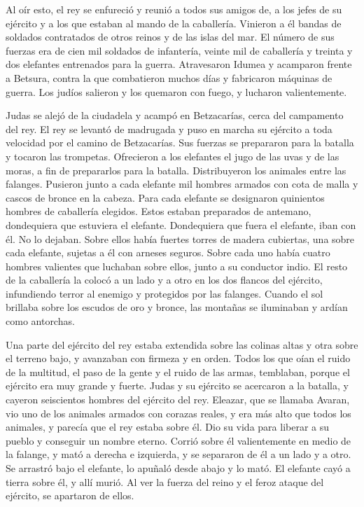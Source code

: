  Al oír esto, el rey se enfureció y reunió a todos sus
amigos de, a los jefes de su ejército y a los que estaban al mando de la
caballería.  Vinieron a él bandas de soldados contratados
de otros reinos y de las islas del mar.  El número de sus
fuerzas era de cien mil soldados de infantería, veinte mil de caballería
y treinta y dos elefantes entrenados para la guerra. 
Atravesaron Idumea y acamparon frente a Betsura, contra la que
combatieron muchos días y fabricaron máquinas de guerra. Los judíos
salieron y los quemaron con fuego, y lucharon valientemente.

 Judas se alejó de la ciudadela y acampó en Betzacarías,
cerca del campamento del rey.  El rey se levantó de
madrugada y puso en marcha su ejército a toda velocidad por el camino de
Betzacarías. Sus fuerzas se prepararon para la batalla y tocaron las
trompetas.  Ofrecieron a los elefantes el jugo de las
uvas y de las moras, a fin de prepararlos para la batalla.
 Distribuyeron los animales entre las falanges. Pusieron
junto a cada elefante mil hombres armados con cota de malla y cascos de
bronce en la cabeza. Para cada elefante se designaron quinientos hombres
de caballería elegidos.  Estos estaban preparados de
antemano, dondequiera que estuviera el elefante. Dondequiera que fuera
el elefante, iban con él. No lo dejaban.  Sobre ellos
había fuertes torres de madera cubiertas, una sobre cada elefante,
sujetas a él con arneses seguros. Sobre cada uno había cuatro hombres
valientes que luchaban sobre ellos, junto a su conductor indio.
 El resto de la caballería la colocó a un lado y a otro
en los dos flancos del ejército, infundiendo terror al enemigo y
protegidos por las falanges.  Cuando el sol brillaba
sobre los escudos de oro y bronce, las montañas se iluminaban y ardían
como antorchas.

 Una parte del ejército del rey estaba extendida sobre
las colinas altas y otra sobre el terreno bajo, y avanzaban con firmeza
y en orden.  Todos los que oían el ruido de la multitud,
el paso de la gente y el ruido de las armas, temblaban, porque el
ejército era muy grande y fuerte.  Judas y su ejército se
acercaron a la batalla, y cayeron seiscientos hombres del ejército del
rey.  Eleazar, que se llamaba Avaran, vio uno de los
animales armados con corazas reales, y era más alto que todos los
animales, y parecía que el rey estaba sobre él.  Dio su
vida para liberar a su pueblo y conseguir un nombre eterno.
 Corrió sobre él valientemente en medio de la falange, y
mató a derecha e izquierda, y se separaron de él a un lado y a otro.
 Se arrastró bajo el elefante, lo apuñaló desde abajo y
lo mató. El elefante cayó a tierra sobre él, y allí murió.
 Al ver la fuerza del reino y el feroz ataque del
ejército, se apartaron de ellos.

